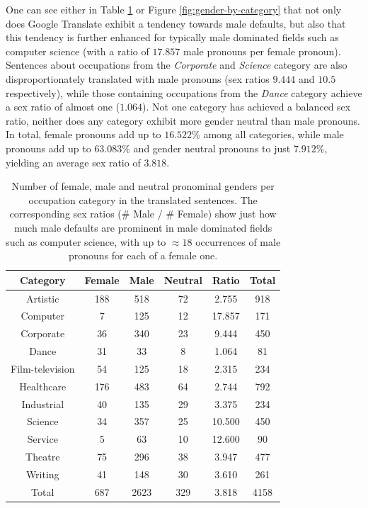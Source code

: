 \documentclass{article}
\begin{document}
One can see either in Table \ref{tab:gender-by-category} or Figure \ref{fig:gender-by-category} that not only does Google Translate exhibit a tendency towards male defaults, but also that this tendency is further enhanced for typically male dominated fields such as computer science (with a ratio of $17.857$ male pronouns per female pronoun). Sentences about occupations from the \emph{Corporate} and \emph{Science} category are also disproportionately translated with male pronouns (sex ratios $9.444$ and $10.5$ respectively), while those containing occupations from the \emph{Dance} category achieve a sex ratio of almost one ($1.064$). Not one category has achieved a balanced sex ratio, neither does any category exhibit more gender neutral than male pronouns. In total, female pronouns add up to $16.522\%$ among all categories, while male pronouns add up to $63.083\%$ and gender neutral pronouns to just $7.912\%$, yielding an average sex ratio of $3.818$.

\begin{table}[H]
	\centering
	\begin{tabular}{|c|c|c|c|c|c|}
	\hline
	Category & Female & Male & Neutral & Ratio & Total \\ \hline
	\hline
	Artistic        & 188 & 518 & 72 & 2.755 	& 918 \\ \hline
	Computer        & 7   & 125 & 12 & 17.857 	& 171 \\ \hline
	Corporate       & 36  & 340 & 23 & 9.444 	& 450 \\ \hline
	Dance           & 31  & 33  & 8  & 1.064 	& 81  \\ \hline
	Film-television & 54  & 125 & 18 & 2.315 	& 234 \\ \hline
	Healthcare      & 176 & 483 & 64 & 2.744 	& 792 \\ \hline
	Industrial      & 40  & 135 & 29 & 3.375   	& 234 \\ \hline
	Science         & 34  & 357 & 25 & 10.500	& 450 \\ \hline
	Service         & 5   & 63  & 10 & 12.600	& 90  \\ \hline
	Theatre         & 75  & 296 & 38 & 3.947 	& 477 \\ \hline
	Writing         & 41  & 148 & 30 & 3.610 	& 261 \\ \hline
	\hline
	Total           & 687 & 2623 & 329 & 3.818 & 4158 \\ \hline
	\end{tabular}
	\label{tab:gender-by-category}
	\caption{Number of female, male and neutral pronominal genders per occupation category in the translated sentences. The corresponding sex ratios (\# Male / \# Female) show just how much male defaults are prominent in male dominated fields such as computer science, with up to $\approx 18$ occurrences of male pronouns for each of a female one.}
\end{table}
\end{document}
